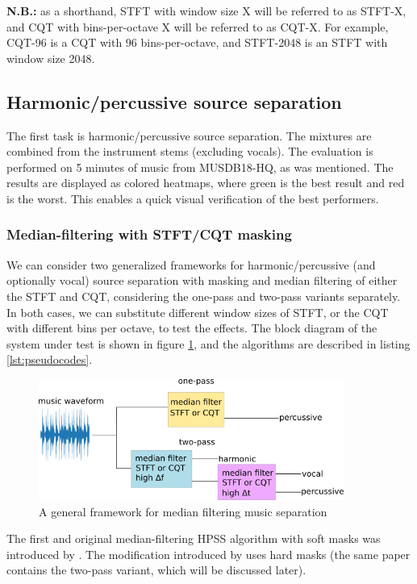 \documentclass[letter,12pt]{article}
\begin{document}
\textbf{N.B.:} as a shorthand, STFT with window size X will be referred to as STFT-X, and CQT with bins-per-octave X will be referred to as CQT-X. For example, CQT-96 is a CQT with 96 bins-per-octave, and STFT-2048 is an STFT with window size 2048.

\subsection{Harmonic/percussive source separation}

The first task is harmonic/percussive source separation. The mixtures are combined from the instrument stems (excluding vocals). The evaluation is performed on 5 minutes of music from MUSDB18-HQ, as was mentioned. The results are displayed as colored heatmaps, where green is the best result and red is the worst. This enables a quick visual verification of the best performers.

\subsubsection{Median-filtering with STFT/CQT masking}
\label{subsec:mfilthpss}

We can consider two generalized frameworks for harmonic/percussive (and optionally vocal) source separation with masking and median filtering of either the STFT and CQT, considering the one-pass and two-pass variants separately. In both cases, we can substitute different window sizes of STFT, or the CQT with different bins per octave, to test the effects. The block diagram of the system under test is shown in figure \ref{fig:fitz2}, and the algorithms are described in listing \ref{lst:pseudocodes}.

\begin{figure}[ht]
	\centering
	\includegraphics[width=10cm]{./medianfiltdiagram.png}
	\caption{A general framework for median filtering music separation}
	\label{fig:fitz2}
\end{figure}

The first and original median-filtering HPSS algorithm with soft masks was introduced by \citet{fitzgerald1}. The modification introduced by \citet{driedger} uses hard masks (the same paper contains the two-pass variant, which will be discussed later).
\end{document}
